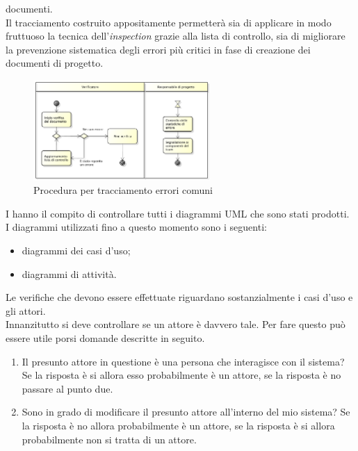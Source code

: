 			documenti.\\
			Il tracciamento costruito appositamente permetterà sia di applicare in modo fruttuoso la tecnica dell'\textit{inspection} grazie alla 
			lista di controllo, sia di migliorare la prevenzione sistematica degli errori più critici in fase di creazione dei documenti di progetto.
			\begin{figure}[H]
					\centering
					\includegraphics[width=0.6\textwidth]{NormeDiProgetto/Pics/ProceduraDecrementoErrori}
					\caption{Procedura per tracciamento errori comuni}
			\end{figure}
			I  hanno il compito di controllare tutti i diagrammi UML che sono stati prodotti. I diagrammi utilizzati fino a questo momento 
			sono i seguenti:
			\begin{itemize}
				\item diagrammi dei casi d'uso;
				\item diagrammi di attività.
			\end{itemize}
				Le verifiche che devono essere effettuate riguardano sostanzialmente i casi d'uso e gli attori.\\
				Innanzitutto si deve controllare se un attore è davvero tale. Per fare questo può essere utile porsi domande descritte in seguito.
				\begin{enumerate}
					\item Il presunto attore in questione è una persona che interagisce con il sistema? Se la risposta è si allora esso probabilmente è un attore, se la risposta è no passare al punto due.
					\item Sono in grado di modificare il presunto attore all'interno del mio sistema? Se la risposta è no allora probabilmente è un attore, se la risposta è si allora probabilmente non si tratta di un attore.
				\end{enumerate}

